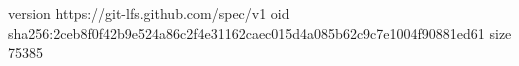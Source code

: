 version https://git-lfs.github.com/spec/v1
oid sha256:2ceb8f0f42b9e524a86c2f4e31162caec015d4a085b62c9c7e1004f90881ed61
size 75385
